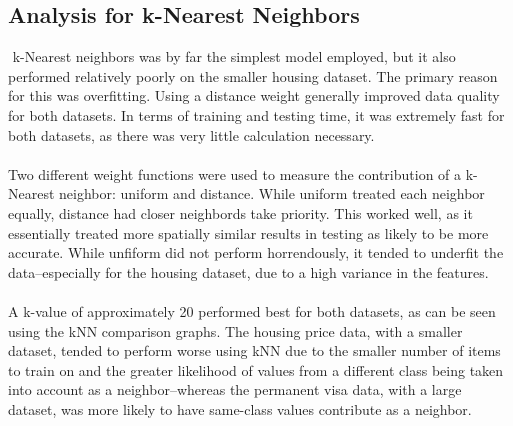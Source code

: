 \documentclass[h]{article}
\begin{document}
\subsection*{Analysis for k-Nearest Neighbors} k-Nearest neighbors was by far the simplest model employed, but it also 
performed relatively poorly on the smaller housing dataset.  The primary reason for this was 
overfitting.  Using a distance weight generally improved data quality for both datasets. 
 In terms of training and testing time, it was extremely fast for both datasets, as there 
 was very little calculation necessary.
\\ \\
Two different weight functions were used to measure the contribution of a k-Nearest 
neighbor: uniform and distance.  While uniform treated each neighbor equally, 
distance had closer neighbords take priority.  This worked well, as it 
essentially treated more spatially similar results in testing as likely to be more 
accurate.  While unfiform did not perform horrendously, it tended to underfit 
the data--especially for the housing dataset, due to a high variance in the 
features.
\\ \\
A k-value of approximately 20 performed best for both datasets, as can be seen 
using the kNN comparison graphs. The housing price data, with a smaller dataset, 
tended to perform worse using kNN due to the smaller number of items to train 
on and the greater likelihood of values from a different class being taken into 
account as a neighbor--whereas the permanent visa data, with a large dataset, 
was more likely to have same-class values contribute as a neighbor. 
\end{document}
